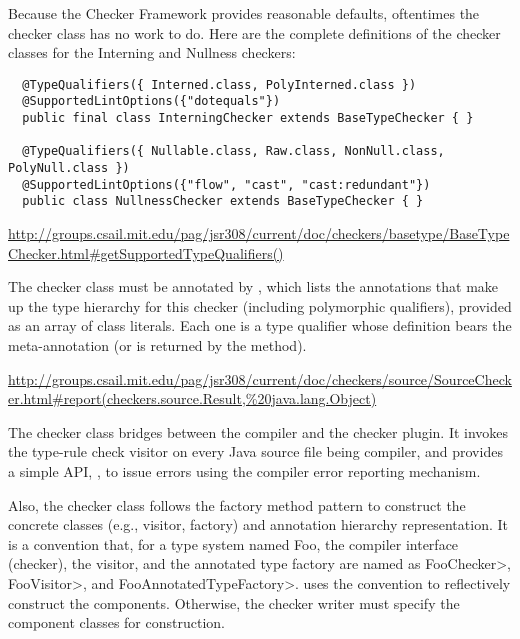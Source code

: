 Because the Checker Framework provides reasonable defaults, oftentimes the
checker class has no work to do.  Here are the complete definitions of the
checker classes for the Interning and Nullness checkers:

\begin{Verbatim}
  @TypeQualifiers({ Interned.class, PolyInterned.class })
  @SupportedLintOptions({"dotequals"})
  public final class InterningChecker extends BaseTypeChecker { }

  @TypeQualifiers({ Nullable.class, Raw.class, NonNull.class, PolyNull.class })
  @SupportedLintOptions({"flow", "cast", "cast:redundant"})
  public class NullnessChecker extends BaseTypeChecker { }
\end{Verbatim}


\urldef{\getSupportedTypeQualifiersURL}\url{http://groups.csail.mit.edu/pag/jsr308/current/doc/checkers/basetype/BaseTypeChecker.html#getSupportedTypeQualifiers()}

The checker class must be annotated by
, which lists the annotations
that make up the type hierarchy for this checker (including
polymorphic qualifiers), provided as an array of class literals.  Each
one is a type qualifier whose definition bears the
 meta-annotation (or is
returned by the
method).

\urldef{\reportURL}\url{http://groups.csail.mit.edu/pag/jsr308/current/doc/checkers/source/SourceChecker.html#report(checkers.source.Result,%20java.lang.Object)}

The checker class bridges between the compiler and the checker plugin.  It
invokes the type-rule check visitor on every Java source file being
compiler, and provides a simple API, , to issue
errors using the compiler error reporting mechanism.

Also, the checker class follows the factory method pattern to
construct the concrete classes (e.g., visitor, factory) and annotation
hierarchy representation.  It is a convention that, for
a type system named Foo, the compiler
interface (checker), the visitor, and the annotated type factory are
named as \<FooChecker>, \<FooVisitor>, and \<FooAnnotatedTypeFactory>.
 uses the convention to
reflectively construct the components.  Otherwise, the checker writer
must specify the component classes for construction.

